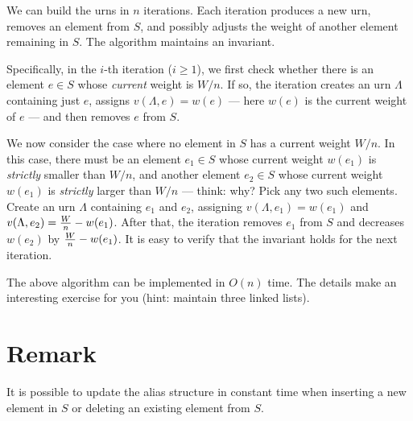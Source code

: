  We can build the urns in $n$ iterations. Each iteration produces a new urn, removes an element from $S$, and possibly adjusts the weight of another element remaining in $S$. The algorithm maintains an invariant.

Specifically, in the $i$-th iteration ($i \ge 1$), we first check whether there is an element $e \in S$ whose {\em current} weight is $W/n$. If so, the iteration creates an urn $\Lambda$ containing just $e$, assigns $v(\Lambda, e) = w(e)$ --- here $w(e)$ is the current weight of $e$ --- and then removes $e$ from $S$.

\vgap

We now consider the case where no element in $S$ has a current weight $W/n$. In this case, there must be an element $e_1 \in S$ whose current weight $w(e_1)$ is {\em strictly} smaller than $W/n$, and another element $e_2 \in S$ whose current weight $w(e_1)$ is {\em strictly} larger than $W/n$ --- think: why? Pick any two such elements. Create an urn $\Lambda$ containing $e_1$ and $e_2$, assigning $v(\Lambda,e_1) = w(e_1)$ and $v(\Lambda,e_2) = \frac{W}{n} - w(e_1)$. After that, the iteration removes $e_1$ from $S$ and decreases $w(e_2)$ by $\frac{W}{n} - w(e_1)$. It is easy to verify that the invariant holds for the next iteration.

\vgap

The above algorithm can be implemented in $O(n)$ time. The details make an interesting exercise for you (hint: maintain three linked lists).

\section{Remark}

It is possible to update the alias structure in constant time \cite{hmm93} when inserting a new element in $S$ or deleting an existing element from $S$.







